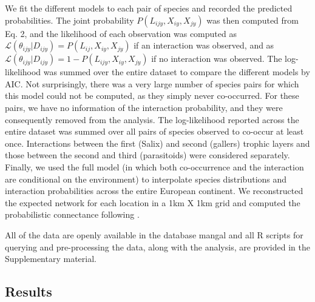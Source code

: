 \documentclass[12pt]{article}
\begin{document}
We fit the different models to each pair of species and recorded the
predicted probabilities. The joint probability $P(L_{ijy},X_{iy},X_{jy})$
was then computed from Eq. 2, and the likelihood of each observation was
computed as $\mathcal{L}(\theta_{ijy}|D_{ijy})=P(L_{ij},X_{iy},X_{jy})$ if an
interaction was observed, and as
$\mathcal{L}(\theta_{ijy}|D_{ijy})=1-P(L_{ijy},X_{iy},X_{jy})$ if no
interaction was observed. The log-likelihood was summed over the entire
dataset to compare the different models by AIC. Not surprisingly, there was a
very large number of species pairs for which this model could not be computed,
as they simply never co-occurred. For these pairs, we have no information of
the interaction probability, and they were consequently removed from the
analysis. The log-likelihood reported across the entire dataset was summed
over all pairs of species observed to co-occur at least once. Interactions
between the first (Salix) and second (gallers) trophic layers and those
between the second and third (parasitoids) were considered separately.
Finally, we used the full model (in which both co-occurrence and the
interaction are conditional on the environment) to interpolate species
distributions and interaction probabilities across the entire European
continent. We reconstructed the expected network for each location in a 1km X
1km grid and computed the probabilistic connectance following
\citep{Poisot2015b}.

All of the data are openly available in the database mangal \citep{Poisot2015c} and
all R scripts for querying and pre-processing the data, along with the
analysis, are provided in the Supplementary material.

\subsection*{Results}
\end{document}
